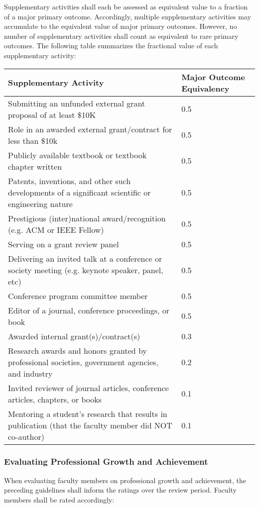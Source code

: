 \documentclass{scrartcl}
\begin{document}
Supplementary activities shall each be assessed as equivalent value to a fraction of a major primary outcome. Accordingly, multiple supplementary activities may accumulate to the equivalent value of major primary outcomes. However, no number of supplementary activities shall count as equivalent to rare primary outcomes. The following table summarizes the fractional value of each supplementary activity:

\begin{longtable}{p{12cm}p{2cm}}

\hline
\textbf{Supplementary Activity} & \textbf{Major Outcome Equivalency} \\
\hline
\endhead %
Submitting an unfunded external grant proposal of at least
\$10K	& 0.5\\ \hline
Role in an awarded external grant/contract for less than \$10k	& 0.5\\ \hline
Publicly available textbook or textbook chapter written	& 0.5 \\ \hline
Patents, inventions, and other such developments of a significant scientific or engineering nature &	0.5 \\ \hline
Prestigious (inter)national award/recognition (e.g. ACM or IEEE Fellow)	&0.5\\ \hline
Serving on a grant review panel	&0.5\\ \hline
Delivering an invited talk at a conference or society meeting (e.g. keynote speaker, panel, etc)	& 0.5\\ \hline
Conference program committee member	&0.5\\ \hline
Editor of a journal, conference proceedings, or book	& 0.5\\ \hline
Awarded internal grant(s)/contract(s)	 & 0.3\\ \hline
Research awards and honors granted by professional societies, government agencies, and industry &	0.2\\ \hline
Invited reviewer of journal articles, conference articles, chapters, or books	& 0.1\\ \hline
Mentoring a student’s research that results in publication (that the faculty member did NOT co-author)&	0.1\\ \hline
\end{longtable}

\subsubsection{Evaluating Professional Growth and Achievement}
When evaluating faculty members on professional growth and achievement, the preceding guidelines shall inform the ratings over the review period. Faculty members shall be rated accordingly:
\end{document}
